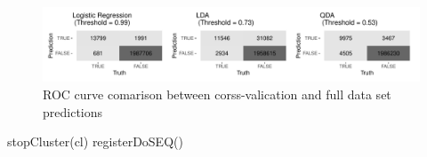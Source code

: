 \documentclass[
]{article}
\newenvironment{Shaded}{\begin{snugshade}}{\end{snugshade}}
\newcommand{\FunctionTok}[1]{\textcolor[rgb]{0.00,0.00,0.00}{#1}}
\newcommand{\NormalTok}[1]{#1}
\begin{document}
\begin{figure}[H]

{\centering \includegraphics{ProjectPart1_MERGED_files/figure-latex/unnamed-chunk-16-1} 

}

\caption{ROC curve comarison between corss-valication and full data set predictions}\label{fig:unnamed-chunk-16}
\end{figure}

\begin{Shaded}
\begin{Highlighting}[]
\FunctionTok{stopCluster}\NormalTok{(cl)}
\FunctionTok{registerDoSEQ}\NormalTok{()}
\end{Highlighting}
\end{Shaded}
\end{document}
